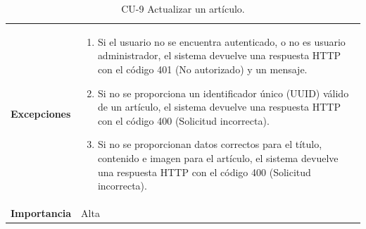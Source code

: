 \begin{table}[p]
\begin{tabularx}{\linewidth}{ p{} p{} }
		\textbf{Excepciones}          & 
            \begin{enumerate}
			\def\labelenumi{\arabic{enumi}.}
			\tightlist
   			\item Si el usuario no se encuentra autenticado, o no es usuario administrador, el sistema devuelve una                 respuesta HTTP con el código 401 (No autorizado) y un mensaje.
                \item Si no se proporciona un identificador único (UUID) válido de un artículo, el sistema devuelve una respuesta HTTP con el código 400 (Solicitud incorrecta).
                \item Si no se proporcionan datos correctos para el título, contenido e imagen para el artículo, el sistema devuelve una respuesta HTTP con el código 400 (Solicitud incorrecta).
            \end{enumerate}\\
		\textbf{Importancia}          & Alta \\
		\bottomrule
	\end{tabularx}
	\caption{CU-9 Actualizar un artículo.}
\end{table}

